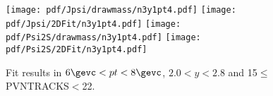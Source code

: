 \begin{figure}[H]
\begin{center}
\texttt{[image: pdf/Jpsi/drawmass/n3y1pt4.pdf]}
\texttt{[image: pdf/Jpsi/2DFit/n3y1pt4.pdf]}
\vspace*{-0.5cm}
\texttt{[image: pdf/Psi2S/drawmass/n3y1pt4.pdf]}
\texttt{[image: pdf/Psi2S/2DFit/n3y1pt4.pdf]}
\vspace*{-0.5cm}
\end{center}
\caption{Fit results in $6\gevc<pt<8\gevc$, $2.0<y<2.8$ and 15$\leq$PVNTRACKS$<$22.}
\label{Fitn3y1pt4}
\end{figure}
